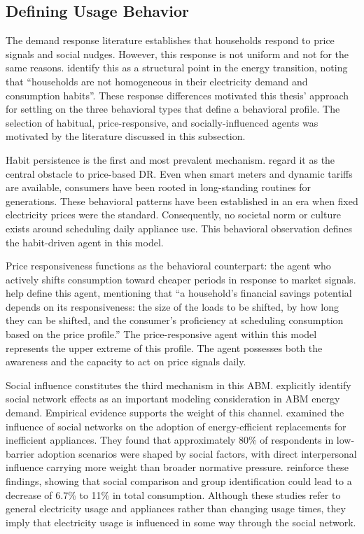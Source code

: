 \documentclass[11pt, a4paper]{article}
\begin{document}
\subsection{Defining Usage Behavior} \label{subs:userbehav}
The demand response literature establishes that households respond to price signals and social nudges. However, this response is not uniform and not for the same reasons. \textcite[][p.~2]{johanning_integrative_2024} identify this as a structural point in the energy transition, noting that ``households are not homogeneous in their electricity demand and consumption habits''. These response differences motivated this thesis' approach for settling on the three behavioral types that define a behavioral profile. The selection of habitual, price-responsive, and socially-influenced agents was motivated by the literature discussed in this subsection.

Habit persistence is the first and most prevalent mechanism. \textcite{haseler_promoting_2024} regard it as the central obstacle to price-based DR. Even when smart meters and dynamic tariffs are available, consumers have been rooted in long-standing routines for generations. These behavioral patterns have been established in an era when fixed electricity prices were the standard. Consequently, no societal norm or culture exists around scheduling daily appliance use. This behavioral observation defines the habit-driven agent in this model.

Price responsiveness functions as the behavioral counterpart: the agent who actively shifts consumption toward cheaper periods in response to market signals. \textcite[][p.~5]{haseler_promoting_2024} help define this agent, mentioning that ``a household's financial savings potential depends on its responsiveness: the size of the loads to be shifted, by how long they can be shifted, and the consumer's proficiency at scheduling consumption based on the price profile.'' The price-responsive agent within this model represents the upper extreme of this profile. The agent possesses both the awareness and the capacity to act on price signals daily.

Social influence constitutes the third mechanism in this ABM. \textcite{johanning_integrative_2024} explicitly identify social network effects as an important modeling consideration in ABM energy demand. Empirical evidence supports the weight of this channel. \textcite{du_effects_2024} examined the influence of social networks on the adoption of energy-efficient replacements for inefficient appliances. They found that approximately 80\% of respondents in low-barrier adoption scenarios were shaped by social factors, with direct interpersonal influence carrying more weight than broader normative pressure. \textcite{mochi_social_2025} reinforce these findings, showing that social comparison and group identification could lead to a decrease of 6.7\% to 11\% in total consumption. Although these studies refer to general electricity usage and appliances rather than changing usage times, they imply that electricity usage is influenced in some way through the social network. 
\end{document}
